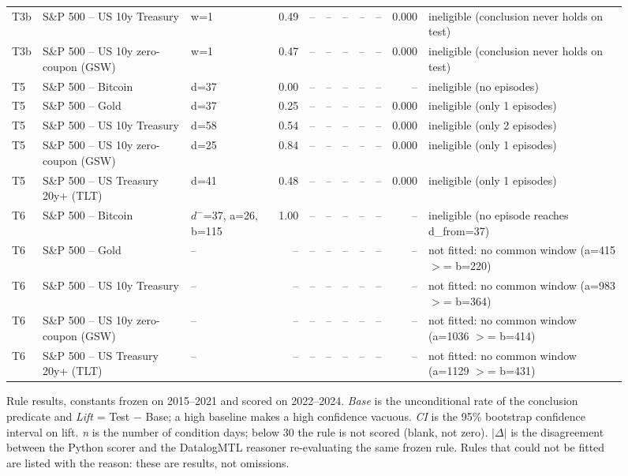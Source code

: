 \begin{figure}
\begin{tabular}{lllrrrrrrrl}
T3b & S\&P 500 -- US 10y Treasury & w=1 & 0.49 & -- & -- & -- & -- & -- & 0.000 & ineligible (conclusion never holds on test) \\
T3b & S\&P 500 -- US 10y zero-coupon (GSW) & w=1 & 0.47 & -- & -- & -- & -- & -- & 0.000 & ineligible (conclusion never holds on test) \\
T5 & S\&P 500 -- Bitcoin & d=37 & 0.00 & -- & -- & -- & -- & -- & -- & ineligible (no episodes) \\
T5 & S\&P 500 -- Gold & d=37 & 0.25 & -- & -- & -- & -- & -- & 0.000 & ineligible (only 1 episodes) \\
T5 & S\&P 500 -- US 10y Treasury & d=58 & 0.54 & -- & -- & -- & -- & -- & 0.000 & ineligible (only 2 episodes) \\
T5 & S\&P 500 -- US 10y zero-coupon (GSW) & d=25 & 0.84 & -- & -- & -- & -- & -- & 0.000 & ineligible (only 1 episodes) \\
T5 & S\&P 500 -- US Treasury 20y+ (TLT) & d=41 & 0.48 & -- & -- & -- & -- & -- & 0.000 & ineligible (only 1 episodes) \\
T6 & S\&P 500 -- Bitcoin & $d^-$=37, a=26, b=115 & 1.00 & -- & -- & -- & -- & -- & -- & ineligible (no episode reaches d\_from=37) \\
T6 & S\&P 500 -- Gold & -- & -- & -- & -- & -- & -- & -- & -- & not fitted: no common window (a=415 $>$= b=220) \\
T6 & S\&P 500 -- US 10y Treasury & -- & -- & -- & -- & -- & -- & -- & -- & not fitted: no common window (a=983 $>$= b=364) \\
T6 & S\&P 500 -- US 10y zero-coupon (GSW) & -- & -- & -- & -- & -- & -- & -- & -- & not fitted: no common window (a=1036 $>$= b=414) \\
T6 & S\&P 500 -- US Treasury 20y+ (TLT) & -- & -- & -- & -- & -- & -- & -- & -- & not fitted: no common window (a=1129 $>$= b=431) \\
\bottomrule
\end{tabular}
\caption{\small{Rule results, constants frozen on 2015--2021 and scored on 2022--2024. \emph{Base} is the unconditional rate of the conclusion predicate and \emph{Lift} = Test $-$ Base; a high baseline makes a high confidence vacuous. \emph{CI} is the 95\% bootstrap confidence interval on lift. \emph{n} is the number of condition days; below 30 the rule is not scored (blank, not zero). $|\Delta|$ is the disagreement between the Python scorer and the DatalogMTL reasoner re-evaluating the same frozen rule. Rules that could not be fitted are listed with the reason: these are results, not omissions.}}
\label{fig:rule-results}
\end{figure}
